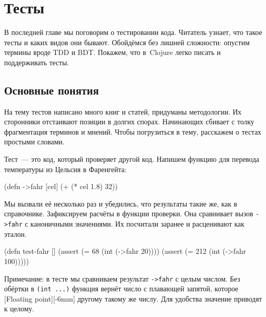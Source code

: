 \chapter{Тесты}


\label{chapter-tests}

\begin{teaser}
В последней главе мы поговорим о тестировании кода. Читатель узнает, что такое
тесты и каких видов они бывают. Обойдёмся без лишней сложности: опустим
термины вроде TDD и BDT. Покажем, что в~Clojure легко писать и
поддерживать тесты.
\end{teaser}

\section{Основные понятия}

На тему тестов написано много книг и статей, придуманы методологии. Их
сторонники отстаивают позиции в долгих спорах. Начинающих сбивает с толку
фрагментация терминов и мнений. Чтобы погрузиться в тему, расскажем о тестах
простыми словами.


Тест~--- это код, который проверяет другой код. Напишем функцию для перевода
температуры из Цельсия в Фаренгейта:

\begin{english}
  \begin{clojure}
(defn ->fahr [cel]
  (+ (* cel 1.8) 32))
  \end{clojure}
\end{english}


Мы вызвали её несколько раз и убедились, что результаты такие же, как в
справочнике. Зафиксируем расчёты в функции проверки. Она сравнивает вызов
\verb|->fahr| с каноничными значениями. Их посчитали заранее и расценивают как
эталон.

\begin{english}
  \begin{clojure}
(defn test-fahr []
  (assert (=  68 (int (->fahr 20))))
  (assert (= 212 (int (->fahr 100)))))
  \end{clojure}
\end{english}


Примечание: в тесте мы сравниваем результат \verb|->fahr| с целым числом. Без
обёртки в \verb|(int ...)| функция вернёт число с плавающей запятой, которое
[Floating point][-6mm]
другому такому же числу. Для удобства значение приводят к целому.

